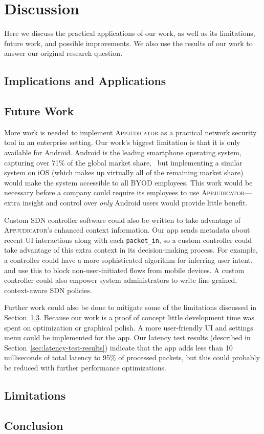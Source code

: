 \section{Discussion}
\label{sec:discussion}

Here we discuss the practical applications of our work, as well as its
limitations, future work, and possible improvements. We also use the results of
our work to answer our original research question.

\subsection{Implications and Applications}
\label{sec:implications-and-applications}

\subsection{Future Work}
\label{sec:future-work}

More work is needed to implement \textsc{Appjudicator} as a practical network
security tool in an enterprise setting. Our work's biggest limitation is that it
is only available for Android. Android is the leading smartphone operating
system, capturing over 71\% of the global market share,~\cite{statcounter2021}
but implementing a similar system on iOS (which makes up virtually all of the
remaining market share) would make the system accessible to all BYOD employees.
This work would be necessary before a company could require its employees to use
\textsc{Appjudicator}---extra insight and control over \textit{only} Android
users would provide little benefit.

Custom SDN controller software could also be written to take advantage of
\textsc{Appjudicator}'s enhanced context information. Our app sends metadata
about recent UI interactions along with each \texttt{packet\_in}, so a custom
controller could take advantage of this extra context in its decision-making
process. For example, a controller could have a more sophisticated algorithm for
inferring user intent, and use this to block non-user-initiated flows from
mobile devices. A custom controller could also empower system administrators to
write fine-grained, context-aware SDN policies. 

Further work could also be done to mitigate some of the limitations discussed in
Section~\ref{sec:limitations}. Because our work is a proof of concept little
development time was spent on optimization or graphical polish. A more
user-friendly UI and settings menu could be implemented for the app. Our latency
test results (described in Section~\ref{sec:latency-test-results}) indicate that
the app adds less than 10 milliseconds of total latency to 95\% of processed
packets, but this could probably be reduced with further performance
optimizations.

\subsection{Limitations}
\label{sec:limitations}

\subsection{Conclusion}
\label{sec:conclusion}

\newpage

